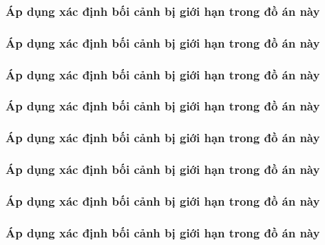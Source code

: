 \subsubsection{Áp dụng xác định bối cảnh bị giới hạn trong đồ án này}

\subsubsection{Áp dụng xác định bối cảnh bị giới hạn trong đồ án này}

\subsubsection{Áp dụng xác định bối cảnh bị giới hạn trong đồ án này}

\subsubsection{Áp dụng xác định bối cảnh bị giới hạn trong đồ án này}

\subsubsection{Áp dụng xác định bối cảnh bị giới hạn trong đồ án này}

\subsubsection{Áp dụng xác định bối cảnh bị giới hạn trong đồ án này}

\subsubsection{Áp dụng xác định bối cảnh bị giới hạn trong đồ án này}

\subsubsection{Áp dụng xác định bối cảnh bị giới hạn trong đồ án này}








